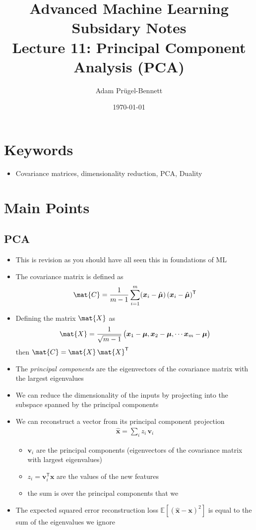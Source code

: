 \documentclass[11pt]{article}
\author{Adam Prügel-Bennett}
\date{\today}
\title{Advanced Machine Learning Subsidary Notes\\\medskip
\large Lecture 11: Principal Component Analysis (PCA)}
\newcommand{\tr}{\textsf{T}}
\begin{document}
\maketitle


\section{Keywords}
\label{sec:org3085121}
\begin{itemize}
\item Covariance matrices, dimensionality reduction, PCA, Duality
\end{itemize}

\section{Main Points}
\label{sec:org3ba5535}

\subsection{PCA}
\label{sec:orgd4530e5}
\begin{itemize}
\item This is revision as you should have all seen this in foundations of ML
\item The covariance matrix is defined as 
$$ \mat{C}= \frac{1}{m-1} \sum_{i=1}^m
     (\bm{x}_i-\hat{\bm{\mu}})\,(\bm{x}_i-\hat{\bm{\mu}})^\tr $$
\item Defining the matrix \(\mat{X}\) as
\begin{align*}
  \mat{X} = \frac{1}{\sqrt{m-1}}\left( \strut \bm{x}_1-\bm{\mu},
  \bm{x}_2-\bm{\mu}, \cdots \bm{x}_m-\bm{\mu} \right)
\end{align*}
then \(\mat{C} = \mat{X} \, \mat{X}^\tr\)
\item The \emph{principal components} are the eigenvectors of the covariance
matrix with the largest eigenvalues
\item We can reduce the dimensionality of the inputs by projecting into
the subspace spanned by the principal components
\item We can reconstruct a vector from its principal component projection
\begin{align*}
  \hat{\bm{x}} = \sum_i z_i \, \bm{v}_i
\end{align*}
\begin{itemize}
\item \(\bm{v}_i\) are the principal components (eigenvectors of the
covariance matrix with largest eigenvalues)
\item \(z_i = \bm{v}_i^\tr \bm{x}\) are the values of the new features
\item the sum is over the principal  components that we
\end{itemize}
\item The expected squared error reconstruction loss
\(\mathbb{E}\left[(\hat{\bm{x}}-\bm{x})^2\right]\) is equal to the
sum of the eigenvalues we ignore
\end{itemize}
\end{document}
